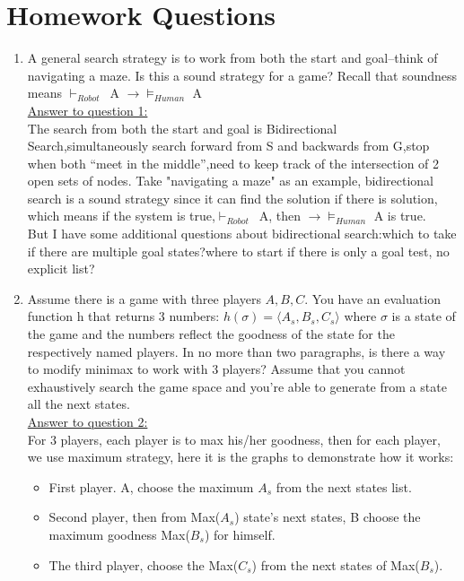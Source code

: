 \documentclass{article}
\begin{document}
\section*{Homework Questions}
\begin{enumerate}
\item A general search strategy is to work from both the start and goal--think of navigating a maze. Is this 
a sound strategy for a game? Recall that soundness means $\vdash_{Robot}$\ A $\rightarrow\models_{Human}$ A\\
\underline{Answer to question 1:}\\
The search from both the start and goal is Bidirectional Search,simultaneously search forward from S and backwards from G,stop when both “meet in the middle”,need to keep track of the intersection of 2 open sets of nodes.
Take "navigating a maze" as an example, bidirectional search is a sound strategy since it can find the solution if there is solution, which means if the system is true,$\vdash_{Robot}$\ A, then $\rightarrow\models_{Human}$ A is true.\\
But I have some additional questions about bidirectional search:which to take if there are multiple goal states?where to start if there is only a goal test, no explicit list?
\item Assume there is a game with three players $A,B,C$. You have an evaluation function h that returns
3 numbers: $h(\sigma) =  \langle A_s, B_s, C_s \rangle$ where $\sigma$ is a state of the game and the numbers reflect the goodness
of the state for the respectively named players. In no more than two paragraphs, is there a way to
modify minimax to work with 3 players? Assume that you cannot exhaustively search the game space
and you're able to generate from a state all the next states.\\
\underline{Answer to question 2:}\\
For 3 players, each player is to max his/her goodness, then for each player, we use maximum strategy, here it is the graphs to demonstrate how it works:\\
\begin{itemize}
\item First player. A, choose the maximum $A_s$ from the next states list.
\item Second player, then from Max($A_s$) state's next states, B choose the maximum goodness Max($B_s$) for himself.
\item The third player, choose the Max($C_s$) from the next states of Max($B_s$).
\end{itemize}

\end{enumerate}
\end{document}
